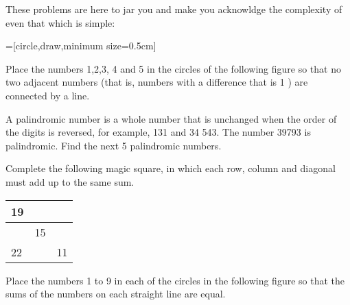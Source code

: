 These problems are here to jar you and make you acknowldge the complexity of even that which is simple:

=[circle,draw,minimum size=0.5cm]
\begin{exercises}
    \begin{questions}
        \Question[2] Place the numbers 1,2,3, 4 and 5 in the circles of the following figure so that no two adjacent numbers (that is, numbers with a difference that is 1 ) are connected by a line.
        \begin{center}
        \end{center}
        \Question[2] A palindromic number is a whole number that is unchanged when the order of the digits is reversed, for example, 131 and 34 543. The number 39793 is palindromic. Find the next 5 palindromic numbers.
        \begin{solutionordottedlines}[1in]
        \end{solutionordottedlines}
        \Question[2] Complete the following magic square, in which each row, column and diagonal must add up to the same sum.
            \begin{center}
                \begin{tabular}{|l|l|l|}
                    \hline
                    19 &  &  \\
                    \hline
                     & 15 &  \\
                    \hline
                    22 &  & 11 \\
                    \hline
                \end{tabular}
            \end{center}
        \Question[2] Place the numbers 1 to 9 in each of the circles in the following figure so that the sums of the numbers on each straight line are equal.
        \begin{center}
\end{center}
\end{questions}
\end{exercises}
